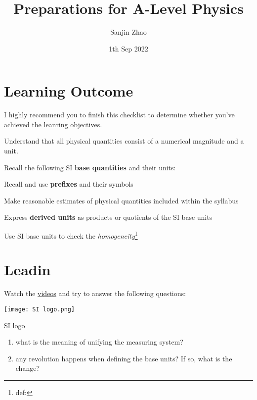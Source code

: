 \documentclass[12pt,a4paper]{tufte-handout}
\title{Preparations for A-Level Physics}
\author{Sanjin Zhao}
\date{1th Sep 2022}  %
\newenvironment{TaskBox} %
{\begin{tcolorbox}[breakable,colback=b1!30,colframe=b1,title=Task]} {\end{tcolorbox}}
\begin{document}
\maketitle%

\section*{Learning Outcome}
I highly recommend you to finish this checklist to determine whether you've achieved the leanring objectives.

\begin{todolist}
	\item Understand that all physical quantities consist of a numerical magnitude and a unit.
	\item Recall the following SI \textbf{base quantities} and their units:
	\item Recall and use \textbf{prefixes} and their symbols
	\item Make reasonable estimates of physical quantities included within the syllabus
	\item Express \textbf{derived units} as products or quotients of the SI base units
	\item Use SI base units to check the \emph{homogeneity}\footnote{def:}
\end{todolist}
\clearpage


\section{Leadin}
Watch the \href{https://www.youtube.com/watch?v=Xpn9eTNZiCs}{videos} and try to answer the following questions:
\begin{marginfigure}
	\texttt{[image: SI logo.png]}
	\caption{SI logo}
\end{marginfigure}
\begin{TaskBox}
\begin{enumerate}
	\item what is the meaning of unifying the measuring system?
	\item any revolution happens when defining the base units? If so, what is the change?
\end{enumerate}
\end{TaskBox}
\end{document}
